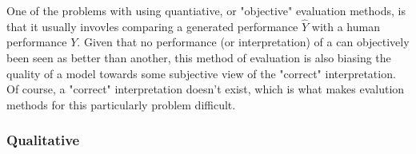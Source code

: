 One of the problems with using quantiative, or "objective" evaluation methods, is that it usually invovles comparing a generated performance $\hat{Y}$ with a human performance ${Y}$. Given that no performance (or interpretation) of a can objectively been seen as better than another, this method of evaluation is also biasing the quality of a model towards some subjective view of the "correct" interpretation. Of course, a "correct" interpretation doesn't exist, which is what makes evalution methods for this particularly problem difficult. 


\subsubsection{Qualitative}

